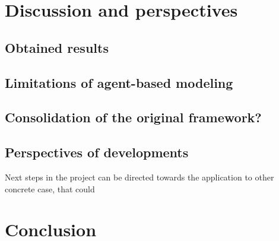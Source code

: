 \documentclass[english]{article}
\begin{document}
\section{Discussion and perspectives}


\subsection*{Obtained results}


\subsection*{Limitations of agent-based modeling}


\subsection*{Consolidation of the original framework?}


\subsection*{Perspectives of developments}

Next steps in the project can be directed towards the application
to other concrete case, that could 


\section*{Conclusion}



\end{document}
